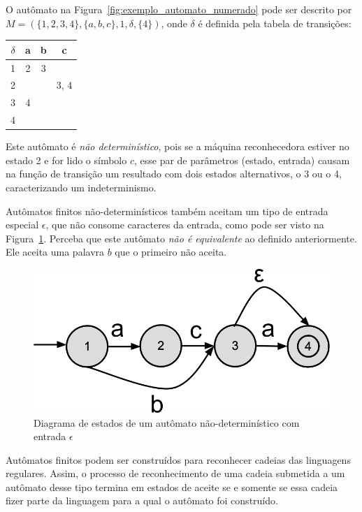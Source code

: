 \documentclass[a4paper,12pt,oneside,onecolumn]{uerj}
\begin{document}
O autômato na Figura~\ref{fig:exemplo_automato_numerado} pode ser descrito por $M=(\{1,2,3,4\}, \{a,b,c\}, 1, \delta, \{4\})$, onde $\delta$ é definida pela tabela de transições:

\begin{center}
	\begin{tabular}{ c || c | c | c }
		{\bf $\delta$} & {\bf a} & {\bf b} & {\bf c} \\
		\hline 
		\hline 
		1 & 2 & 3 &  \\ 
		\hline 
		2 &   &   & 3, 4 \\ 
		\hline 
		3 & 4 &   &  \\ 
		\hline 
		4 &   &   &  \\ 
	\end{tabular}
\end{center}

Este autômato é \emph{não determinístico}, pois se a máquina reconhecedora estiver no  estado 2 e for lido o símbolo $c$, esse par de parâmetros (estado, entrada) causam na função de transição um resultado com dois estados alternativos, o 3 ou o 4, caracterizando um indeterminismo.

Autômatos finitos não-determinísticos também aceitam um tipo de entrada especial $\epsilon$, que não consome caracteres da entrada, como pode ser visto na Figura~\ref{fig:exemplo_automato_epsilon}. Perceba que este autômato \emph{não é equivalente} ao definido anteriormente. Ele aceita uma palavra $b$ que o primeiro não aceita.

\begin{figure}[!htbp]
  \centering
  \includegraphics[scale=0.3]{figures/exemplo_automato_epsilon.png}
  \caption{Diagrama de estados de um autômato não-determinístico com entrada $\epsilon$}
  \label{fig:exemplo_automato_epsilon}
\end{figure}


Autômatos finitos podem ser construídos para reconhecer cadeias das linguagens regulares. Assim, o processo de reconhecimento de uma cadeia submetida a um autômato desse tipo termina em estados de aceite se e somente se essa cadeia fizer parte da linguagem para a qual o autômato foi construído.
\end{document}
